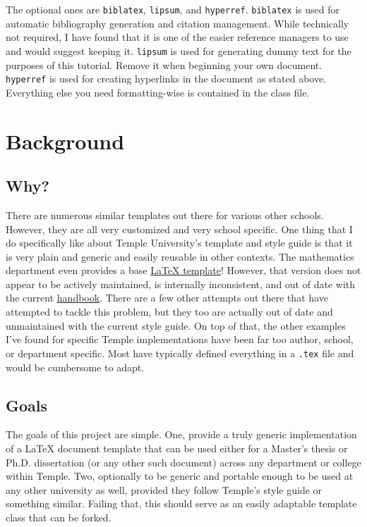\documentclass{thesis-dissertation}
\begin{document}
The optional ones are \verb|biblatex|, \verb|lipsum|, and \verb|hyperref|. \verb|biblatex| is used for automatic bibliography generation and citation management. While technically not required, I have found that it is one of the easier reference managers to use and would suggest keeping it. \verb|lipsum| is used for generating dummy text for the purposes of this tutorial. Remove it when beginning your own document. \verb|hyperref| is used for creating hyperlinks in the document as stated above. Everything else you need formatting-wise is contained in the class file. 

\chapter{Background}
\section{Why?}
There are numerous similar templates out there for various other schools. However, they are all very customized and very school specific. One thing that I do specifically like about Temple University's template and style guide is that it is very plain and generic and easily reusable in other contexts. The mathematics department even provides a base \href{https://cst.temple.edu/department-mathematics/graduate/current-students/tu-thesis}{\LaTeX{} template}! However, that version does not appear to be actively maintained, is internally inconsistent, and out of date with the current \href{https://grad.temple.edu/resources/dissertation-thesis-handbook}{handbook}. There are a few other attempts out there that have attempted to tackle this problem, but they too are actually out of date and unmaintained with the current style guide. On top of that, the other examples I've found for specific Temple implementations have been far too author, school, or department specific. Most have typically defined everything in a \verb|.tex| file and would be cumbersome to adapt. 
\section{Goals}
The goals of this project are simple. One, provide a truly generic implementation of a \LaTeX{} document template that can be used either for a Master's thesis or Ph.D. dissertation (or any other such document) across any department or college within Temple. Two, optionally to be generic and portable enough to be used at any other university as well, provided they follow Temple's style guide or something similar. Failing that, this should serve as an easily adaptable template class that can be forked.
\end{document}
